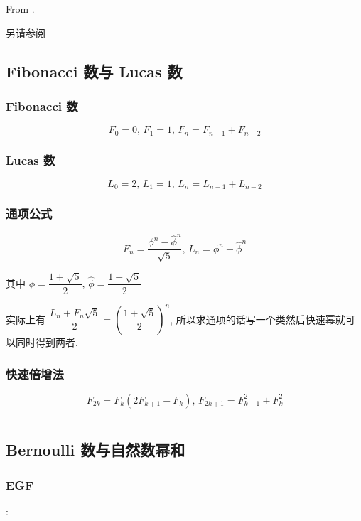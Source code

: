 From \cite{antileafstandard}.

另请参阅 

\subsection{Fibonacci 数与 Lucas 数}
\label{sec:fibonacci-数与-lucas-数}

\subsubsection{Fibonacci 数}
\label{ssec:fibonacci-数}

\[
    F_0 = 0, \, F_1 = 1, \, F_n = F_{n - 1} + F_{n - 2}
\]

\subsubsection{Lucas 数}
\label{ssec:lucas-数}

\[
    L_0 = 2, \, L_1 = 1, \, L_n = L_{n - 1} + L_{n - 2}
\]

\subsubsection{通项公式}

\[
    F_n = \frac{\phi^n - {\hat\phi}^n}{\sqrt 5}, \, L_n = \phi^n + {\hat\phi}^n
\]
    
其中 \(\phi = \dfrac{1 + \sqrt 5}{2}, \, \hat\phi = \dfrac{1 - \sqrt 5}{2}\)
    
实际上有 \(\dfrac{L_n + F_n \sqrt 5}{2} = \left( \dfrac{1 + \sqrt 5}{2} \right)^n\), 所以求通项的话写一个类然后快速幂就可以同时得到两者.
    
\subsubsection{快速倍增法}

\[
    F_{2k} = F_k \left( 2 F_{k + 1} - F_k \right), \, F_{2k + 1} = F_{k + 1}^2 + F_k^2
\]

\inputminted{cpp}{src/src/fib.cpp}

\subsection{Bernoulli 数与自然数幂和}
\label{sec:bernoulli-数与自然数幂和}

\subsubsection{EGF}:

